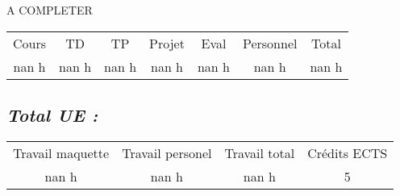 %
A COMPLETER%
\begin{longtable}{c c c c c c c}%
\hline%
Cours&TD&TP&Projet&Eval&Personnel&Total\\%
nan h&nan h&nan h&nan h&nan h&nan h&nan h\\%
\hline%
\end{longtable}%
\subsection{\textit{Total UE :}}%
\label{subsec:textitTotalUE}%

%
\begin{longtable}{c c c c}%
\hline%
Travail maquette&Travail personel&Travail total&Crédits ECTS\\%
nan h&nan h&nan h&5\\%
\hline%
\end{longtable}